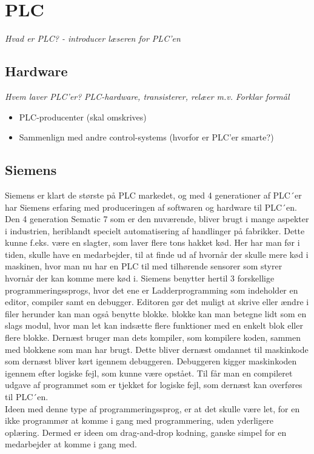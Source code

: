 \section{PLC}
\textit{Hvad er PLC? - introducer læseren for PLC'en}


\subsection{Hardware}
\textit{Hvem laver PLC'er?}
\textit{PLC-hardware, transisterer, relæer m.v.}
\textit{Forklar formål}
\begin{itemize}
    \item PLC-producenter (skal omskrives)
    \item Sammenlign med andre control-systems (hvorfor er PLC'er smarte?)
\end{itemize}




\subsection{Siemens}
Siemens er klart de største på PLC markedet, og med 4 generationer af PLC´er har Siemens erfaring med produceringen af softwaren og hardware til PLC´en.\\
Den 4 generation Sematic 7 som er den nuværende, bliver brugt i mange aspekter i industrien, heriblandt specielt automatisering af handlinger på fabrikker.
Dette kunne f.eks. være en slagter, som laver flere tons hakket kød. Her har man før i tiden, skulle have en medarbejder, til at finde ud af hvornår der skulle mere kød i maskinen, hvor man nu har en PLC til med tilhørende sensorer som styrer hvornår der kan komme mere kød i.
Siemens benytter hertil 3 forskellige programmeringssprogs, hvor det ene er  Ladderprogramming som indeholder en editor, compiler samt en debugger. 
Editoren gør det muligt at skrive eller ændre i filer herunder kan man også benytte blokke. blokke kan man betegne lidt som en slags modul, hvor man let kan indsætte flere funktioner med en enkelt blok eller flere blokke.
Dernæst bruger man dets kompiler, som kompilere koden, sammen med blokkene som man har brugt.
Dette bliver dernæst omdannet til maskinkode som dernæst bliver kørt igennem debuggeren.
Debuggeren kigger maskinkoden igennem efter logiske fejl, som kunne være opstået. 
Til får man en compileret udgave af programmet som er tjekket for logiske fejl, som dernæst kan overføres til PLC´en.\\
Ideen med denne type af programmeringssprog, er at det skulle være let, for en ikke programmør at komme i gang med programmering, uden yderligere oplæring. Dermed er ideen om drag-and-drop kodning, ganske simpel for en medarbejder at komme i gang med.

